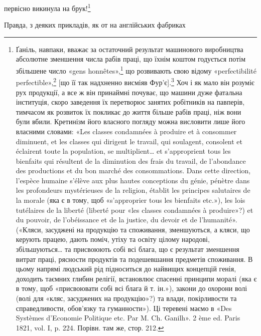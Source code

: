 первісно викинула на брук!\footnote{
Ґаніль, навпаки, вважає за остаточний результат машинового виробництва
абсолютне зменшення числа рабів праці, що їхнім коштом годується
потім збільшене число «gens honnêtes»,\footnote*{
— порядних людей. \emph{Ред.}
} що розвивають свою відому
«perfectibilité perfectible»,\footnote*{
— здібну вдосконалюватися здібність до вдосконалення. \emph{Ред.}
} [що її так надхненно висміяв Фур’є].\footnote*{
Заведений у прямі дужки кінець речення беремо з французького
видання. \emph{Ред.}
} Хоч і як мало він розуміє рух продукції, а все ж він принаймні почуває,
що машини дуже фатальна інституція, скоро заведення їх перетворює
занятих робітників на павперів, тимчасом як розвиток їх покликає до
життя більше рабів праці, ніж вони були вбили. Кретинізм його власного
погляду можна висловити лише його власними словами: «Les classes
condamnées à produire et à consommer diminuent, et les classes qui dirigent
le travail, qui soulagent, consolent et éclairent toute la population,
se multiplient\dots{} et s’approprient tous les bienfaits qui résultent de la diminution
des frais du travail, de l’abondance des productions et du bon marché
des consommations. Dans cette direction, l’espèce humaine s’élève aux plus
hautes conceptions du génie, pénètre dans les profondeurs mystérieuses de la
religion, établit les principes salutaires de la morale (яка є в тому, щоб «s’approprier
tous les bienfaits etc.»), les lois tutélaires de la liberté (liberté pour
«les classes condamnées à produire»?) et du pouvoir, de l’obéissance et de
la justice, du devoir et de l’humanité». («Кляси, засуджені на продукцію
та споживання, зменшуються, а кляси, що керують працею, дають поміч,
утіху та освіту цілому народові, збільшуються\dots{} та присвоюють собі
всі блага, що є результат зменшення витрат праці, рясности продуктів
та подешевшання предметів споживання. В цьому напрямі людський
рід підноситься до найвищих концепцій генія, доходить таємних глибин
релігії, встановлює спасенні принципи моралі (яка є в тому, щоб «присвоювати
собі всі блага й т. ін.»), закони до охорони волі (волі для «кляс,
засуджених на продукцію»?) та влади, покірливости та справедливости,
обов’язку та гуманности»). Ці теревені маємо в «Des Systèmes d’Economie
Politique etc. Par M. Ch. Ganilh». 2 ème ed. Paris 1821, vol. I, p. 224.
Порівн. там же, стор. 212.
}

Правда, з деяких прикладів, як от на англійських фабриках



